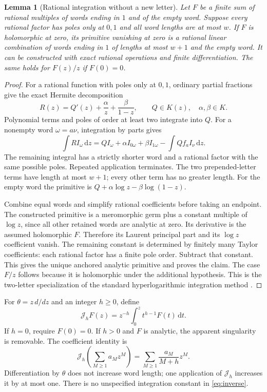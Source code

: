 \documentclass[11pt,letterpaper]{article}
\numberwithin{equation}{section}
\newtheorem{lemma}[theorem]{Lemma}
\theoremstyle{definition}\newtheorem{definition}[theorem]{Definition}
\theoremstyle{remark}\newtheorem{remark}[theorem]{Remark}
\newcommand{\dd}{\,\mathrm d}\newcommand{\Li}{\operatorname{Li}}
\begin{document}
\begin{lemma}[Rational integration without a new letter]\label{thm:primitive}
Let $F$ be a finite sum of rational multiples of words ending in $1$
and of the empty word. Suppose every rational factor has poles only
at $0,1$ and all word lengths are at most $w$. If $F$ is holomorphic
at zero, its primitive vanishing at zero is a rational linear
combination of words ending in $1$ of lengths at most $w+1$ and the
empty word. It can be constructed with exact rational operations and
finite differentiation. The same holds for $F(z)/z$ if $F(0)=0$.
\end{lemma}
\begin{proof}
For a rational function with poles only at $0,1$, ordinary partial
fractions give the exact Hermite decomposition
\begin{equation}\label{eq:hermite}
 R(z)=Q'(z)+\frac{\alpha}{z}+\frac{\beta}{1-z},
 \qquad Q\in K(z),\quad\alpha,\beta\in K.
\end{equation}
Polynomial terms and poles of order at least two integrate into $Q$.
For a nonempty word $\omega=a\nu$, integration by parts gives
\begin{equation}\label{eq:intstep}
 \int R I_\omega\dd z
 =Q I_\omega+\alpha I_{0\omega}+\beta I_{1\omega}
             -\int Q f_a I_\nu\dd z.
\end{equation}
The remaining integral has a strictly shorter word and a rational
factor with the same possible poles. Repeated application terminates.
The two prepended-letter terms have length at most $w+1$; every other
term has no greater length. For the empty word the primitive is
$Q+\alpha\log z-\beta\log(1-z)$.

Combine equal words and simplify rational coefficients before taking
an endpoint. The constructed primitive is a meromorphic germ plus a
constant multiple of $\log z$, since all other retained words are
analytic at zero. Its derivative is the assumed holomorphic $F$.
Therefore its Laurent principal part and its $\log z$ coefficient
vanish. The remaining constant is determined by finitely many Taylor
coefficients: each rational factor has a finite pole order. Subtract
that constant. This gives the unique anchored analytic primitive and
proves the claim. The case $F/z$ follows because it is holomorphic
under the additional hypothesis. This is the two-letter specialization
of the standard hyperlogarithmic integration method \cite{panzer}.
\end{proof}

For $\theta=z\,d/dz$ and an integer $h\ge0$, define
\begin{equation}\label{eq:inverse}
 \mathcal J_hF(z)=z^{-h}\int_0^z t^{h-1}F(t)\dd t.
\end{equation}
If $h=0$, require $F(0)=0$. If $h>0$ and $F$ is analytic, the
apparent singularity is removable. The coefficient identity is
\begin{equation}\label{eq:inversecoeff}
 \mathcal J_h\!\left(\sum_{M\ge1}a_Mz^M\right)
              =\sum_{M\ge1}\frac{a_M}{M+h}z^M.
\end{equation}
Differentiation by $\theta$ does not increase word length; one
application of $\mathcal J_h$ increases it by at most one. There is no
unspecified integration constant in \eqref{eq:inverse}.
\end{document}
